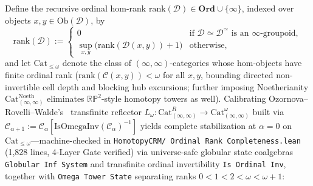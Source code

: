 Define the recursive ordinal hom-rank $\mathrm{rank}(\mathcal{D}) \in \mathbf{Ord} \cup \{\infty\}$, indexed over objects $x, y \in \mathrm{Ob}(\mathcal{D})$, by
\[
  \mathrm{rank}(\mathcal{D}) := \begin{cases}
    0 & \text{if } \mathcal{D} \simeq \mathcal{D}^{\simeq} \text{ is an $\infty$-groupoid}, \\[2pt]
    \sup_{x, y} \bigl(\mathrm{rank}(\mathcal{D}(x, y)) + 1\bigr) & \text{otherwise,}
  \end{cases}
\]
and let $\mathrm{Cat}_{\le \omega}$ denote the class of $(\infty, \infty)$-categories whose hom-objects have finite ordinal rank ($\mathrm{rank}(\mathcal{C}(x, y)) < \omega$ for all $x, y$, bounding directed non-invertible cell depth and blocking hub excursions; further imposing Noetherianity $\mathrm{Cat}^{\mathrm{Noeth}}_{(\infty,\infty)}$ eliminates $\mathbb{R}\mathbb{P}^2$-style homotopy towers as well). Calibrating Ozornova--Rovelli--Walde's~\cite[Questions~5.60 and~5.62 (v1 Question~5.58)]{ORW26} transfinite reflector $L_\omega : \mathrm{Cat}^R_{(\infty, \infty)} \to \mathrm{Cat}^\omega_{(\infty, \infty)}$ built via $\mathcal{C}_{\alpha+1} := \mathcal{C}_\alpha[\mathrm{IsOmegaInv}(\mathcal{C}_\alpha)^{-1}]$ yields complete stabilization at $\alpha = 0$ on $\mathrm{Cat}_{\le \omega}$---machine-checked in \texttt{HomotopyCRM/ Ordinal Rank Completeness.lean} (1,828 lines, 4-Layer Gate verified) via universe-safe globular state coalgebras \texttt{Globular Inf System} and transfinite ordinal invertibility \texttt{Is Ordinal Inv}, together with \texttt{Omega Tower State} separating ranks $0 < 1 < 2 < \omega < \omega + 1$:

